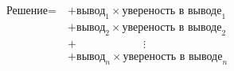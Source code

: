 \documentclass[preview]{standalone}
\begin{document}
\begin{align*}
\text{Решение}=\  &+\text{вывод}_1 \times \text{увереность в выводе}_1\\ &+\text{вывод}_2 \times \text{увереность в выводе}_2\\ &+\qquad\qquad\qquad\vdots\\ &+\text{вывод}_n \times \text{увереность в выводе}_n\\
\end{align*}
\end{document}
